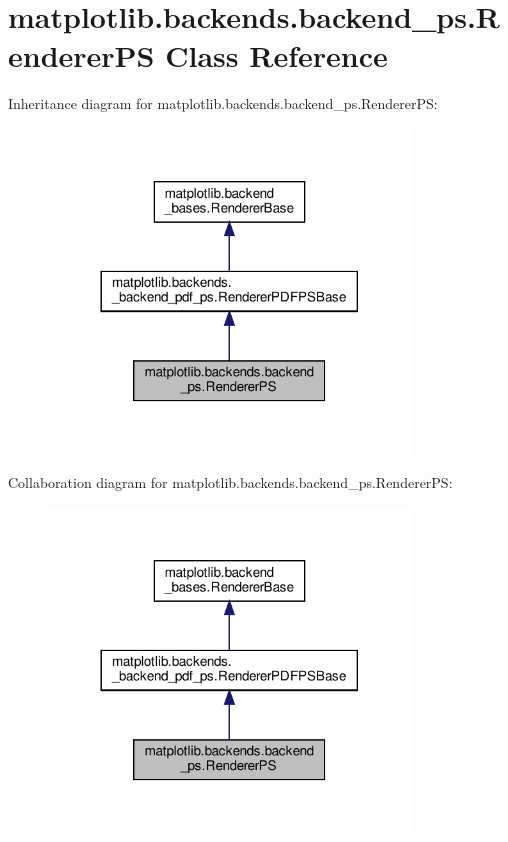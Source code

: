\hypertarget{classmatplotlib_1_1backends_1_1backend__ps_1_1RendererPS}{}\section{matplotlib.\+backends.\+backend\+\_\+ps.\+Renderer\+PS Class Reference}
\label{classmatplotlib_1_1backends_1_1backend__ps_1_1RendererPS}


Inheritance diagram for matplotlib.\+backends.\+backend\+\_\+ps.\+Renderer\+PS\+:
\nopagebreak
\begin{figure}[H]
\begin{center}
\leavevmode
\includegraphics[width=272pt]{classmatplotlib_1_1backends_1_1backend__ps_1_1RendererPS__inherit__graph}
\end{center}
\end{figure}


Collaboration diagram for matplotlib.\+backends.\+backend\+\_\+ps.\+Renderer\+PS\+:
\nopagebreak
\begin{figure}[H]
\begin{center}
\leavevmode
\includegraphics[width=272pt]{classmatplotlib_1_1backends_1_1backend__ps_1_1RendererPS__coll__graph}
\end{center}
\end{figure}
